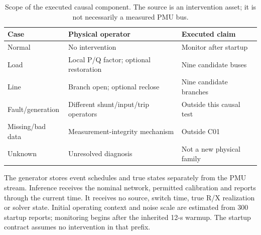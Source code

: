 \begin{table}[t]\centering\small
\caption{Scope of the executed causal component. The source is an intervention asset; it is not necessarily a measured PMU bus.}\label{tab:narrative-scope}
\begin{tabularx}{\columnwidth}{@{}lXX@{}}\toprule
Case & Physical operator & Executed claim\\\midrule
Normal & No intervention & Monitor after startup\\
Load & Local P/Q factor; optional restoration & Nine candidate buses\\
Line & Branch open; optional reclose & Nine candidate branches\\
Fault/generation & Different shunt/input/trip operators & Outside this causal test\\
Missing/bad data & Measurement-integrity mechanism & Outside C01\\
Unknown & Unresolved diagnosis & Not a new physical family\\\bottomrule
\end{tabularx}\end{table}

The generator stores event schedules and true states separately from the PMU stream. Inference receives the nominal network, permitted calibration and reports through the current time. It receives no source, switch time, true R/X realization or solver state. Initial operating context and noise scale are estimated from 300 startup reports; monitoring begins after the inherited 12-s warmup. The startup contract assumes no intervention in that prefix.
